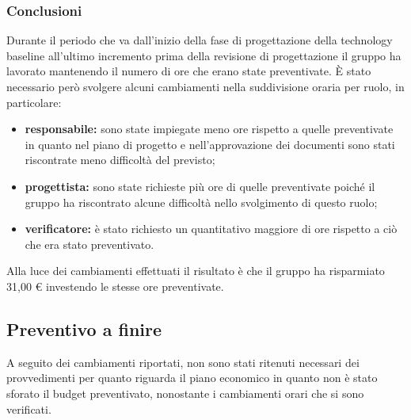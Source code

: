 		\subsubsection*{Conclusioni}
			Durante il periodo che va dall'inizio della fase di progettazione della technology baseline all'ultimo incremento prima della revisione di progettazione il gruppo ha lavorato mantenendo il numero di ore che erano state preventivate. È stato necessario però svolgere alcuni cambiamenti nella suddivisione oraria per ruolo, in particolare:
			\begin{itemize}
				\item \textbf{responsabile:} sono state impiegate meno ore rispetto a quelle preventivate in quanto nel piano di progetto e nell'approvazione dei documenti sono stati riscontrate meno difficoltà del previsto;
				\item \textbf{progettista:} sono state richieste più ore di quelle preventivate poiché il gruppo ha riscontrato alcune difficoltà nello svolgimento di questo ruolo;
				\item \textbf{verificatore:} è stato richiesto un quantitativo maggiore di ore rispetto a ciò che era stato preventivato.
			\end{itemize}
			Alla luce dei cambiamenti effettuati il risultato è che il gruppo ha risparmiato 31,00 € investendo le stesse ore preventivate.
		

		\subsection{Preventivo a finire}
			A seguito dei cambiamenti riportati, non sono stati ritenuti necessari dei provvedimenti per quanto riguarda il piano economico in quanto non è stato sforato il budget preventivato, nonostante i cambiamenti orari che si sono verificati.
			
			
			
			